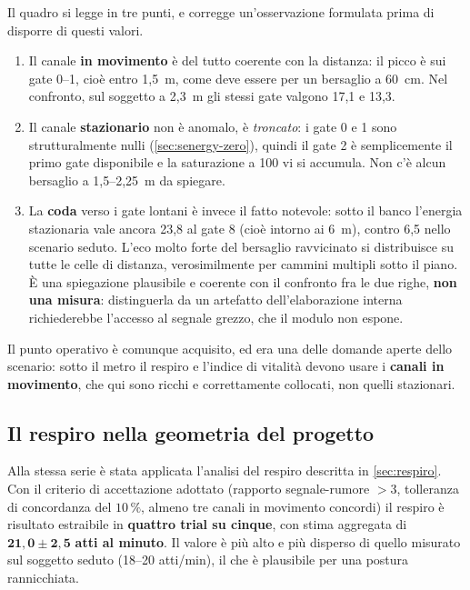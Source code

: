 Il quadro si legge in tre punti, e corregge un'osservazione formulata prima di
disporre di questi valori.

\begin{enumerate}[leftmargin=1.8em,itemsep=3pt]
  \item Il canale \textbf{in movimento} è del tutto coerente con la distanza: il picco
        è sui gate 0--1, cioè entro 1,5~m, come deve essere per un bersaglio a 60~cm.
        Nel confronto, sul soggetto a 2,3~m gli stessi gate valgono 17,1 e 13,3.
  \item Il canale \textbf{stazionario} non è anomalo, è \emph{troncato}: i gate 0 e 1
        sono strutturalmente nulli (\cref{sec:senergy-zero}), quindi il gate 2 è
        semplicemente il primo gate disponibile e la saturazione a 100 vi si accumula.
        Non c'è alcun bersaglio a 1,5--2,25~m da spiegare.
  \item La \textbf{coda} verso i gate lontani è invece il fatto notevole: sotto il
        banco l'energia stazionaria vale ancora 23,8 al gate 8 (cioè intorno ai 6~m),
        contro 6,5 nello scenario seduto. L'eco molto forte del bersaglio ravvicinato
        si distribuisce su tutte le celle di distanza, verosimilmente per cammini
        multipli sotto il piano. È una spiegazione plausibile e coerente con il
        confronto fra le due righe, \textbf{non una misura}: distinguerla da un
        artefatto dell'elaborazione interna richiederebbe l'accesso al segnale grezzo,
        che il modulo non espone.
\end{enumerate}

Il punto operativo è comunque acquisito, ed era una delle domande aperte dello
scenario: sotto il metro il respiro e l'indice di vitalità devono usare i
\textbf{canali in movimento}, che qui sono ricchi e correttamente collocati, non
quelli stazionari.

\subsection{Il respiro nella geometria del progetto}

Alla stessa serie è stata applicata l'analisi del respiro descritta in
\cref{sec:respiro}. Con il criterio di accettazione adottato (rapporto
segnale-rumore $> 3$, tolleranza di concordanza del $10\,\%$, almeno tre canali in
movimento concordi) il respiro è risultato estraibile in \textbf{quattro trial su
cinque}, con stima aggregata di $\mathbf{21{,}0 \pm 2{,}5}$ \textbf{atti al minuto}.
Il valore è più alto e più disperso di quello misurato sul soggetto seduto (18--20
atti/min), il che è plausibile per una postura rannicchiata.

